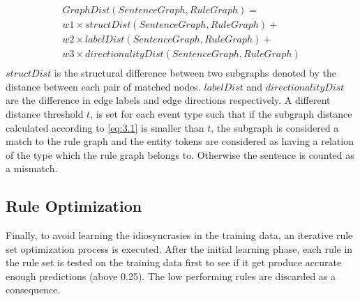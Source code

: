 \begin{equation}\label{eq:3.1}
\begin{split}
GraphDist(SentenceGraph, RuleGraph) = \\
w1 \times structDist(SentenceGraph, RuleGraph)  +\\ 
w2 \times labelDist(SentenceGraph, RuleGraph)   +\\
w3 \times directionalityDist(SentenceGraph, RuleGraph)\\
\end{split}
\end{equation}
$structDist$ is the structural difference between two subgraphs denoted by the distance between each pair of matched nodes. $labelDist$ and $directionalityDist$ are the difference in edge labels and edge directions respectively\cite{liu2013approximate}. A different distance threshold $t$, is set for each event type such that if the subgraph distance calculated according to \ref{eq:3.1} is smaller than $t$, the subgraph is considered a match to the rule graph and the entity tokens are considered as having a relation of the type which the rule graph belongs to. Otherwise the sentence is counted as a mismatch.
\subsection{Rule Optimization}
Finally, to avoid learning the idiosyncrasies in the training data, an iterative rule set optimization process is executed. After the initial learning phase, each rule in the rule set is tested on the training data first to see if it get produce accurate enough predictions (above 0.25). The low performing rules are discarded as a consequence.   
